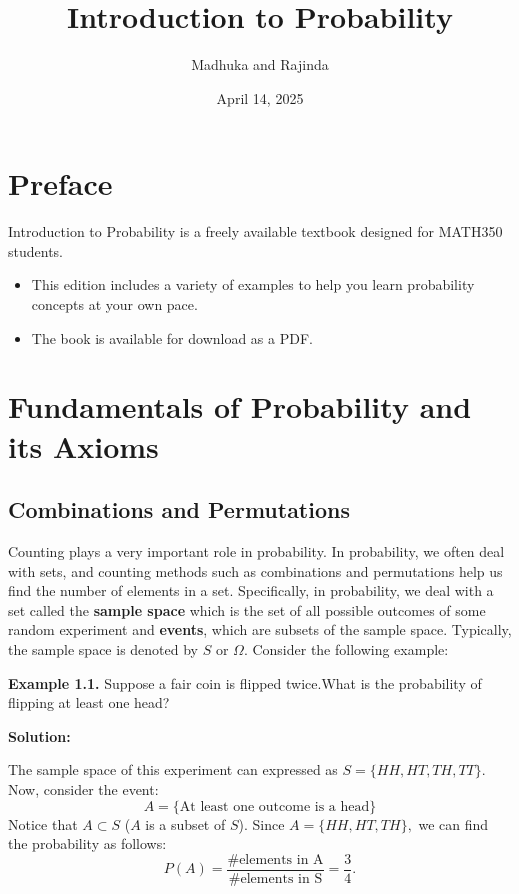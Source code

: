 \documentclass[
  12pt,
]{krantzNoCorner}
\title{Introduction to Probability}
\author{Madhuka and Rajinda}
\date{April 14, 2025}
\providecommand{\tightlist}{%
  \setlength{\itemsep}{0pt}\setlength{\parskip}{0pt}}
\begin{document}
\maketitle

{
\hypersetup{linkcolor=}
\setcounter{tocdepth}{2}
\tableofcontents
}
\hypertarget{preface}{%
\chapter*{Preface}\label{preface}}


Introduction to Probability is a freely available textbook designed for MATH350 students.

\begin{itemize}
\tightlist
\item
  This edition includes a variety of examples to help you learn probability concepts at your own pace.
\item
  The book is available for download as a PDF.
\end{itemize}

\hypertarget{fundamentals-of-probability-and-its-axioms}{%
\chapter{Fundamentals of Probability and its Axioms}\label{fundamentals-of-probability-and-its-axioms}}

\hypertarget{combinations-and-permutations}{%
\section{Combinations and Permutations}\label{combinations-and-permutations}}

Counting plays a very important role in probability. In probability, we
often deal with sets, and counting methods such as combinations and
permutations help us find the number of elements in a set. Specifically,
in probability, we deal with a set called the \textbf{sample space} which is
the set of all possible outcomes of some random experiment and
\textbf{events}, which are subsets of the sample space. Typically, the sample
space is denoted by \(S\) or \(\Omega.\) Consider the following example:

\textbf{Example 1.1.} Suppose a fair coin is flipped twice.What is the
probability of flipping at least one head?

\textbf{Solution:}

The sample space of this experiment can expressed as
\(S=\{HH,HT,TH,TT\}\). Now, consider the event:
\[A=\{\text{At least one outcome is a head}\}\] Notice that \(A\subset S\)
(\(A\) is a subset of \(S\)). Since \(A=\{HH,HT,TH\},\) we can find the
probability as follows:
\[P(A)= \frac{\#\text{elements in A}}{\#\text{elements in S}}=\frac{3}{4}.\]
\end{document}
